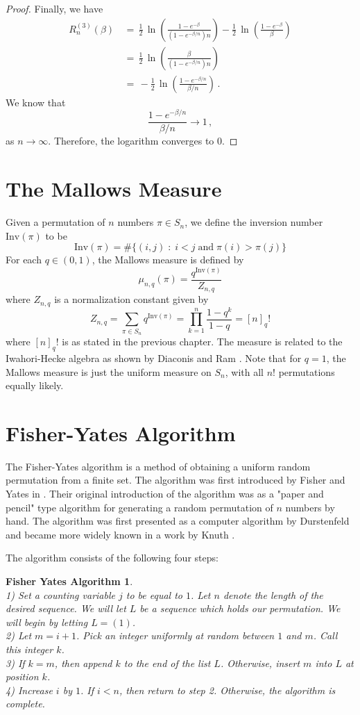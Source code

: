 \documentclass[12pt]{report}
\theoremstyle{definition}
\begin{document}
\begin{proof}
Finally, we have 
\begin{align*}
R_n^{(3)}(\beta)\, 
&=\, \frac{1}{2}\, \ln\left(\frac{1-e^{-\beta}}{(1-e^{-\beta/n})n}\right) - \frac{1}{2}\, \ln\left( \frac{1-e^{-\beta}}{\beta} \right)\\
&=\, \frac{1}{2}\, \ln\left( \frac{\beta}{(1-e^{-\beta/n})n}\right)\\
&=\, - \frac{1}{2}\, \ln\left( \frac{1-e^{-\beta/n}}{\beta/n} \right)\, .
\end{align*}
We know that
$$
\frac{1-e^{-\beta/n}}{\beta/n} \to 1\, ,
$$
as $n \to \infty$. Therefore, the logarithm converges to $0$.
\end{proof}

\section{The Mallows Measure}
Given a permutation of $n$ numbers $\pi\in S_n$, we define the inversion number $\mathrm{Inv}(\pi)$ to be 
$$
\mathrm{Inv}(\pi)=\#\{(i,j) \; : \;i<j \;\mathrm{and}\; \pi(i)>\pi(j)\}
$$
For each $q\in(0,1)$, the Mallows measure \cite{Mallows} is defined by 
$$
\mu_{n,q}(\pi)=\frac{q^{\mathrm{Inv}(\pi)}}{Z_{n,q}}
$$
where $Z_{n,q}$ is a normalization constant given by 
$$
Z_{n,q}=\sum_{\pi\in S_n} q^{\mathrm{Inv}(\pi)}=\prod_{k=1}^n\frac{1-q^k}{1-q}=[n]_q!
$$
where $[n]_q!$ is as stated in the previous chapter.  
The measure is related to the Iwahori-Hecke algebra as shown by Diaconis and Ram \cite{DiaconisRam}.  Note that for $q=1$, the Mallows measure is just the uniform measure on $S_n$, with all $n!$ permutations equally likely.  
\section{Fisher-Yates Algorithm}
The Fisher-Yates algorithm is a method of obtaining a uniform random permutation from a finite set.  The algorithm was first introduced by Fisher and Yates in \cite{FisherYates}.  Their original introduction of the algorithm was as a "paper and pencil" type algorithm for generating a random permutation of $n$ numbers by hand.  The algorithm was first presented as a computer algorithm by Durstenfeld \cite{Durstenfeld} and became more widely known in a work by Knuth \cite{Knuth}. 

The algorithm consists of the following four steps:
\newtheorem*{fy}{Fisher Yates Algorithm}
\begin{fy} 
\ \\
{\em
1) Set a counting variable $j$ to be equal to $1$.  Let $n$ denote the length of the desired sequence.  We will let $L$ be a sequence which holds our permutation.  We will begin by letting $L=(1)$.\\
2) Let $m=i+1$.  Pick an integer uniformly at random between $1$ and $m$.  Call this integer $k$.  \\
3) If $k=m$, then append $k$ to the end of the list $L$.  Otherwise, insert $m$ into $L$ at position $k$.  \\
4) Increase $i$ by $1$.  If $i<n$, then return to step 2.  Otherwise, the algorithm is complete.}  
\end{fy}
\end{document}
